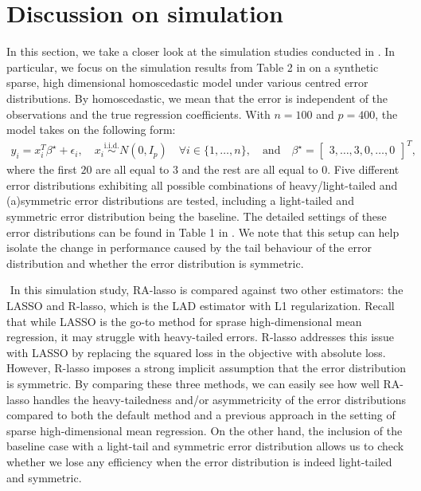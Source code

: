 

\section{Discussion on simulation}\label{sec:simulation}
In this section, we take a closer look at the simulation studies conducted in \citet{fan2017estimation}. In particular, we focus on the simulation results from Table 2 in \citet{fan2017estimation} on a synthetic sparse, high dimensional homoscedastic model under various centred error distributions. By homoscedastic, we mean that the error is independent of the observations and the true regression coefficients. With $n=100$ and $p=400$, the model takes on the following form:
\begin{align*}
y_i = x_i^T \beta^\star + \epsilon_i, \quad x_i \overset{\text{i.i.d.}}{\sim} N(0, I_p) \quad \forall i \in \{1,\dots,n\}, \quad \text{and} \quad \beta^\star = \begin{bmatrix} 3, \dots, 3, 0, \dots, 0 \end{bmatrix}^T,
\end{align*}
where the first $20$ are all equal to $3$ and the rest are all equal to $0$. Five different error distributions exhibiting all possible combinations of heavy/light-tailed and (a)symmetric error distributions are tested, including a light-tailed and symmetric error distribution being the baseline. The detailed settings of these error distributions can be found in Table 1 in \citet{fan2017estimation}. We note that this setup can help isolate the change in performance caused by the tail behaviour of the error distribution and whether the error distribution is symmetric.

$ $\newline
In this simulation study, RA-lasso is compared against two other estimators: the LASSO and R-lasso, which is the LAD estimator with L1 regularization. Recall that while LASSO is the go-to method for sprase high-dimensional mean regression, it may struggle with heavy-tailed errors. R-lasso addresses this issue with LASSO by replacing the squared loss in the objective with absolute loss. However, R-lasso imposes a strong implicit assumption that the error distribution is symmetric. By comparing these three methods, we can easily see how well RA-lasso handles the heavy-tailedness and/or asymmetricity of the error distributions compared to both the default method and a previous approach in the setting of sparse high-dimensional mean regression. On the other hand, the inclusion of the baseline case with a light-tail and symmetric error distribution allows us to check whether we lose any efficiency when the error distribution is indeed light-tailed and symmetric.


